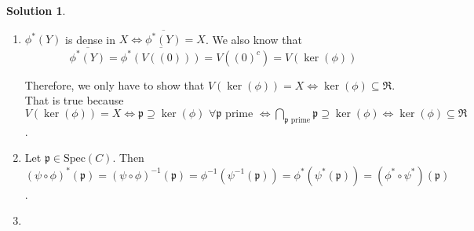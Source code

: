 \documentclass[12pt]{article}
\newcommand{\ip}{\ensuremath{\mathfrak{p}}}
\newcommand{\Spec}{\ensuremath{\text{Spec}}}
\newcommand*\closure[1]{\overline{#1}}
\theoremstyle{definition}
\newtheorem*{sol}{Solution}
\begin{document}
\begin{sol}
\begin{enumerate}[label=(\roman*)]
		\item $\phi^*(Y)$ is dense in $X \iff \closure{\phi^*(Y)} = X$. We also know that
		\[
			\closure{\phi^*(Y)} = \closure{\phi^*(V((0)))} = V((0)^c) = V(\ker(\phi))
		\]

		Therefore, we only have to show that $V(\ker(\phi)) = X \iff \ker(\phi) \subseteq \mathfrak{R}$. That is true because $V(\ker(\phi)) = X \iff \ip \supseteq \ker(\phi) \, \, \forall \ip \text{ prime } \iff \bigcap_{\ip \text{ prime}} \ip \supseteq \ker(\phi) \iff \ker(\phi) \subseteq \mathfrak{R}$.

		\item Let $\ip \in \Spec(C)$. Then $(\psi \circ \phi)^*(\ip) = (\psi \circ \phi)^{-1}(\ip) = \phi^{-1}(\psi^{-1}(\ip)) = \phi^*(\psi^{*}(\ip)) = (\phi^* \circ \psi^*)(\ip)$.

		\item 
		

	\end{enumerate}
\end{sol}
\end{document}
